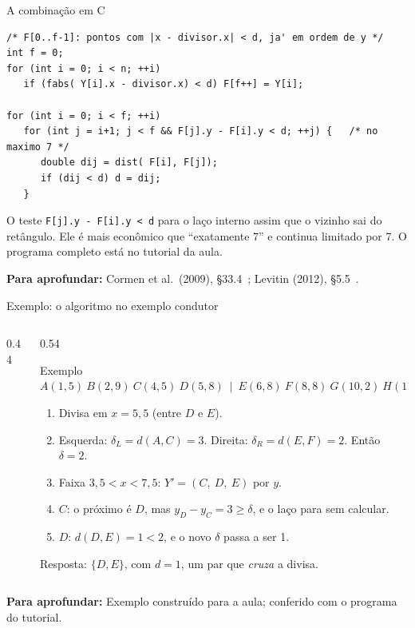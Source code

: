 \documentclass[aspectratio=169,xcolor=table]{beamer}
\newcommand{\pontosexemplo}{%
  \foreach \n/\x/\y/\p in {A/1/5/above left, B/2/9/above left, C/4/5/above left,
      D/5/8/above left, E/6/8/above right, F/8/8/above right, G/10/2/above left,
      H/11/9/above left}{%
    \node[pt] (\n) at (\x,\y) {};
    \node[ptlbl, \p] at (\n) {\n};
  }%
}
\newcommand{\fonte}[1]{%
  \vfill
  {\tiny\color{gray!55!black}\textbf{Para aprofundar:} #1\par}%
}
\begin{document}
\begin{frame}[fragile]{A combinação em C}
\begin{lstlisting}
/* F[0..f-1]: pontos com |x - divisor.x| < d, ja' em ordem de y */
int f = 0;
for (int i = 0; i < n; ++i)
   if (fabs( Y[i].x - divisor.x) < d) F[f++] = Y[i];

for (int i = 0; i < f; ++i)
   for (int j = i+1; j < f && F[j].y - F[i].y < d; ++j) {   /* no maximo 7 */
      double dij = dist( F[i], F[j]);
      if (dij < d) d = dij;
   }
\end{lstlisting}
  \scriptsize
  O teste \texttt{F[j].y - F[i].y < d} para o laço interno assim que o vizinho sai do
  retângulo. Ele é mais econômico que ``exatamente 7'' e continua limitado por 7.
  O programa completo está no tutorial da aula.
  \fonte{Cormen et al.\ (2009), \S 33.4~\cite{cormen2009introduction};
    Levitin (2012), \S 5.5~\cite{levitin2012introduction}.}
\end{frame}

\begin{frame}{Exemplo: o algoritmo no exemplo condutor}
  \begin{columns}[c]
    \begin{column}{0.44\textwidth}
      \centering
    \end{column}
    \begin{column}{0.54\textwidth}
      \begin{exampleblock}{Exemplo}
        \scriptsize
        $A(1,5)\ B(2,9)\ C(4,5)\ D(5,8)\ \mid\ E(6,8)\ F(8,8)\ G(10,2)\ H(11,9)$
        \begin{enumerate}\scriptsize
          \item Divisa em $x=5{,}5$ (entre $D$ e $E$).
          \item Esquerda: $\delta_L=d(A,C)=3$. Direita: $\delta_R=d(E,F)=2$. Então $\delta=2$.
          \item Faixa $3{,}5<x<7{,}5$: $Y'=(C,\ D,\ E)$ por $y$.
          \item $C$: o próximo é $D$, mas $y_D-y_C=3\ge\delta$, e o laço para sem calcular.
          \item $D$: $d(D,E)=1<2$, e o novo $\delta$ passa a ser 1.
        \end{enumerate}
        Resposta: $\{D,E\}$, com $d=1$, um par que \emph{cruza} a divisa.
      \end{exampleblock}
    \end{column}
  \end{columns}
  \fonte{Exemplo construído para a aula; conferido com o programa do tutorial.}
\end{frame}
\end{document}
